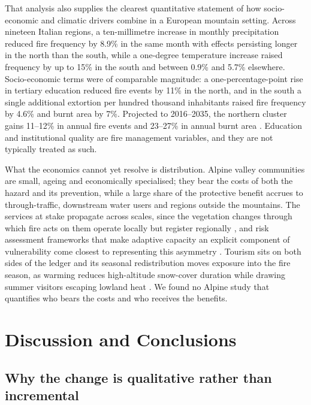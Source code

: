 \documentclass[11pt,a4paper]{article}
\begin{document}
That analysis also supplies the clearest quantitative statement of how socio-economic and climatic drivers combine in a European mountain setting. Across nineteen Italian regions, a ten-millimetre increase in monthly precipitation reduced fire frequency by 8.9\% in the same month with effects persisting longer in the north than the south, while a one-degree temperature increase raised frequency by up to 15\% in the south and between 0.9\% and 5.7\% elsewhere. Socio-economic terms were of comparable magnitude: a one-percentage-point rise in tertiary education reduced fire events by 11\% in the north, and in the south a single additional extortion per hundred thousand inhabitants raised fire frequency by 4.6\% and burnt area by 7\%. Projected to 2016--2035, the northern cluster gains 11--12\% in annual fire events and 23--27\% in annual burnt area \citep{michetti_forest_2019}. Education and institutional quality are fire management variables, and they are not typically treated as such.

What the economics cannot yet resolve is distribution. Alpine valley communities are small, ageing and economically specialised; they bear the costs of both the hazard and its prevention, while a large share of the protective benefit accrues to through-traffic, downstream water users and regions outside the mountains. The services at stake propagate across scales, since the vegetation changes through which fire acts on them operate locally but register regionally \citep{vukomanovic_systematic_2019}, and risk assessment frameworks that make adaptive capacity an explicit component of vulnerability come closest to representing this asymmetry \citep{riviere_mapping_2023, lecinadiaz_assessing_2021}. Tourism sits on both sides of the ledger and its seasonal redistribution moves exposure into the fire season, as warming reduces high-altitude snow-cover duration while drawing summer visitors escaping lowland heat \citep{pede_mountain_2022, abrham_wildfires_2024}. We found no Alpine study that quantifies who bears the costs and who receives the benefits.


\section{Discussion and Conclusions}

\subsection{Why the change is qualitative rather than incremental}
\end{document}
